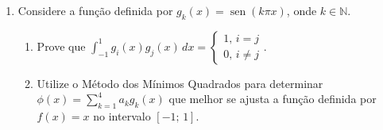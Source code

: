 \documentclass[12pt,a4paper]{article}
\DeclareMathOperator{\sen}{sen}
\begin{document}
\begin{enumerate}
  \item Considere a função definida por $g_k(x)=\sen(k\pi x)$, onde $k\in\mathbb{N}$.
    \begin{enumerate}
      \item Prove que $\displaystyle\int_{-1}^1 g_i(x)g_j(x)\,dx = \begin{cases}1,\,i = j \\ 0,\,i\neq j\end{cases}$.
      \item Utilize o Método dos Mínimos Quadrados para determinar $\displaystyle \phi(x) = \sum_{k=1}^4 a_kg_k(x)$
      que melhor se ajusta a função definida por $f(x) = x$ no intervalo $[-1;\, 1]$.
   \end{enumerate}

\end{enumerate}
\end{document}
